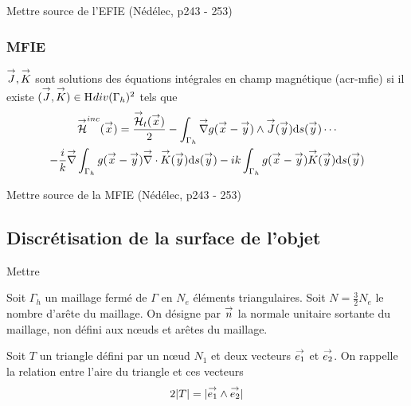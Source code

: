         \begin{REF}
          Mettre source de l'EFIE (Nédélec, p243 - 253)
        \end{REF}

      \subsubsection{MFIE}

        \begin{defn}
          \({\overset{\rightarrow}{J}},{\overset{\rightarrow}{K}}\) sont solutions des équations intégrales en champ magnétique (\gls{acr-mfie}) si il existe \(({\overset{\rightarrow}{J}},{\overset{\rightarrow}{K}}) \in \mathrm{H}_\mathrm{{}}{div}(\Gamma_h)^2\) tels que
          \begin{multline}
            \label{eq:form_int:MFIE}
            \vH^{inc}(\vx) =
            \frac{\vH_t(\vx)}{2}
              - \int_{\Gamma_h} \vgrad g(\vx - \vy) \pvect \vJ(\vy) \dd{s}(\vy) \cdots \\
            - \frac{i}{k} \vgrad \int_{\Gamma_h}  g(\vx - \vy)\vdiv\vK(\vy)\dd{s}(\vy)
              - ik \int_{\Gamma_h} g(\vx - \vy)\vK(\vy)\dd{s}(\vy)
          \end{multline}
        \end{defn}

        \begin{REF}
          Mettre source de la MFIE (Nédélec, p243 - 253)
        \end{REF}

  \subsection{Discrétisation de la surface de l'objet}

    \begin{REF}
      Mettre \cite{medgyesi-mitschang_integral_1985}
    \end{REF}

    Soit \(\Gamma_h\) un maillage fermé de \(\Gamma\) en \(N_e\) éléments triangulaires. Soit \(N=\frac{3}{2}N_e\) le nombre d'arête du maillage. On désigne par \({\overset{\rightarrow}{n}}\) la normale unitaire sortante du maillage, non défini aux nœuds et arêtes du maillage.

    Soit \(T\) un triangle défini par un nœud \(N_1\) et deux vecteurs \({\overset{\rightarrow}{e_1}}\) et \({\overset{\rightarrow}{e_2}}\). On rappelle la relation entre l'aire du triangle et ces vecteurs
    \begin{equation}
      2|T| = |{\overset{\rightarrow}{e_1}}\wedge{\overset{\rightarrow}{e_2}}|
    \end{equation}

